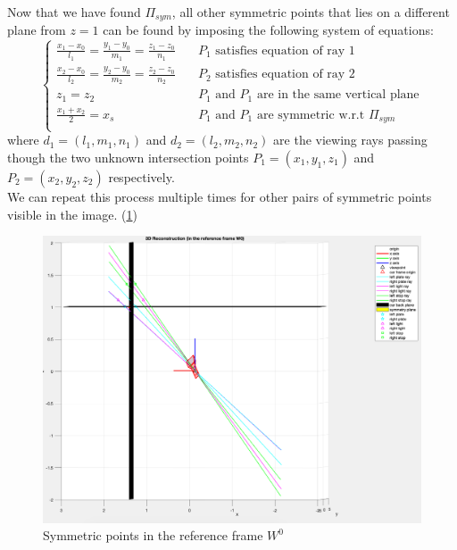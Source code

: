 \documentclass{article}
\begin{document}
\newpage
Now that we have found $\Pi_{sym}$, all other symmetric points that lies on a different plane from $z=1$ can be found by imposing the following system of equations:
$$ \begin{cases}
\frac{x_1-x_0}{l_1} = \frac{y_1-y_0}{m_1} = \frac{z_1-z_0}{n_1} & \quad P_1 \text{ satisfies equation of ray 1} \\
\frac{x_2-x_0}{l_2} = \frac{y_2-y_0}{m_2} = \frac{z_2-z_0}{n_2} & \quad P_2 \text{ satisfies equation of ray 2} \\
z_1 = z_2 & \quad P_1 \text{ and } P_1 \text{ are in the same vertical plane} \\
\frac{x_1 + x_2}{2} = x_s & \quad P_1 \text{ and } P_1 \text{ are symmetric w.r.t } \Pi_{sym} \\
\end{cases} $$
where $d_1 = (l_1, m_1, n_1)$ and $d_2 = (l_2, m_2, n_2)$ are the viewing rays
passing though the two unknown intersection points $P_1 = (x_1, y_1, z_1)$ and $P_2 = (x_2, y_2, z_2)$ respectively.
\\
We can repeat this process multiple times for other pairs of symmetric points visible in the image. (\ref{fig:3dreconstructionW0})
\begin{figure}[hbt!]
\centering
\includegraphics[scale=0.3]{images/3DreconstructionW0.png}
\caption{Symmetric points in the reference frame $W^0$}
\label{fig:3dreconstructionW0}
\end{figure}
\\
\end{document}
